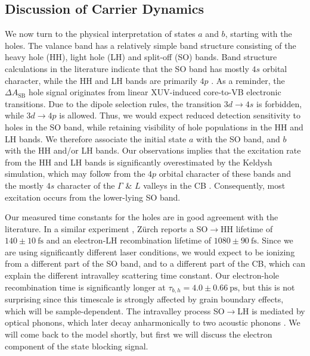 \subsection{Discussion of Carrier Dynamics}
\label{sec:carrier_dyn_discussion}

We now turn to the physical interpretation of states $a$ and $b$, starting with the holes. The valance band has a relatively simple band structure consisting of the heavy hole (HH), light hole (LH) and split-off (SO) bands. Band structure calculations in the literature indicate that the SO band has mostly $4s$ orbital character, while the HH and LH bands are primarily $4p$ \cite{zurchDirectSimultaneousObservation2017}. As a reminder, the $\Delta A_{\textrm{SB}}$ hole signal originates from linear XUV-induced core-to-VB electronic transitions. Due to the dipole selection rules, the transition $3d \rightarrow 4s$ is forbidden, while $3d \rightarrow 4p$ is allowed. Thus, we would expect reduced detection sensitivity to holes in the SO band, while retaining visibility of hole populations in the HH and LH bands. We therefore associate the initial state $a$ with the SO band, and $b$ with the HH and/or LH bands. Our observations implies that the excitation rate from the HH and LH bands is significantly overestimated by the Keldysh simulation, which may follow from the $4p$ orbital character of these bands and the mostly $4s$ character of the $\Gamma$ \& $L$ valleys in the CB \cite{kaplanFemtosecondTrackingCarrier2018}. Consequently, most excitation occurs from the lower-lying SO band.

Our measured time constants for the holes are in good agreement with the literature. In a similar experiment \cite{zurchDirectSimultaneousObservation2017}, Z\"{u}rch reports a SO$\rightarrow$HH lifetime of $140 \pm 10 \ \textrm{fs}$ and an electron-LH recombination lifetime of $1080 \pm 90 \ \textrm{fs}$. Since we are using significantly different laser conditions, we would expect to be ionizing from a different part of the SO band, and to a different part of the CB, which can explain the different intravalley scattering time constant. Our electron-hole recombination time is significantly longer at $\tau_{b,h} = 4.0 \pm 0.66 \ \textrm{ps}$, but this is not surprising since this timescale is strongly affected by grain boundary effects, which will be sample-dependent. The intravalley process SO$\rightarrow$LH is mediated by optical phonons, which later decay anharmonically to two acoustic phonons \cite{kaplanFemtosecondTrackingCarrier2018}. We will come back to the model shortly, but first we will discuss the electron component of the state blocking signal.

